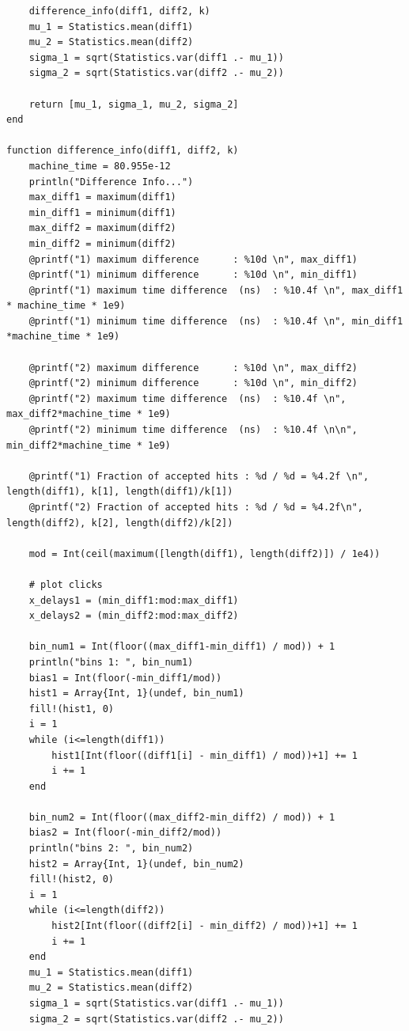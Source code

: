 \documentclass[10pt, final]{article}
\begin{document}
\begin{mdframed}
\begin{lstlisting}
    difference_info(diff1, diff2, k)
    mu_1 = Statistics.mean(diff1)
    mu_2 = Statistics.mean(diff2)
    sigma_1 = sqrt(Statistics.var(diff1 .- mu_1))
    sigma_2 = sqrt(Statistics.var(diff2 .- mu_2)) 

    return [mu_1, sigma_1, mu_2, sigma_2]
end

function difference_info(diff1, diff2, k)
    machine_time = 80.955e-12
    println("Difference Info...")
    max_diff1 = maximum(diff1)
    min_diff1 = minimum(diff1)
    max_diff2 = maximum(diff2)
    min_diff2 = minimum(diff2)
    @printf("1) maximum difference      : %10d \n", max_diff1)
    @printf("1) minimum difference      : %10d \n", min_diff1)
    @printf("1) maximum time difference  (ns)  : %10.4f \n", max_diff1 * machine_time * 1e9)
    @printf("1) minimum time difference  (ns)  : %10.4f \n", min_diff1 *machine_time * 1e9)

    @printf("2) maximum difference      : %10d \n", max_diff2)
    @printf("2) minimum difference      : %10d \n", min_diff2)
    @printf("2) maximum time difference  (ns)  : %10.4f \n", max_diff2*machine_time * 1e9)
    @printf("2) minimum time difference  (ns)  : %10.4f \n\n", min_diff2*machine_time * 1e9)

    @printf("1) Fraction of accepted hits : %d / %d = %4.2f \n", length(diff1), k[1], length(diff1)/k[1])
    @printf("2) Fraction of accepted hits : %d / %d = %4.2f\n", length(diff2), k[2], length(diff2)/k[2])

    mod = Int(ceil(maximum([length(diff1), length(diff2)]) / 1e4))

    # plot clicks 
    x_delays1 = (min_diff1:mod:max_diff1)
    x_delays2 = (min_diff2:mod:max_diff2)

    bin_num1 = Int(floor((max_diff1-min_diff1) / mod)) + 1
    println("bins 1: ", bin_num1)
    bias1 = Int(floor(-min_diff1/mod))
    hist1 = Array{Int, 1}(undef, bin_num1)
    fill!(hist1, 0)
    i = 1
    while (i<=length(diff1))
        hist1[Int(floor((diff1[i] - min_diff1) / mod))+1] += 1
        i += 1
    end

    bin_num2 = Int(floor((max_diff2-min_diff2) / mod)) + 1
    bias2 = Int(floor(-min_diff2/mod))
    println("bins 2: ", bin_num2)
    hist2 = Array{Int, 1}(undef, bin_num2)
    fill!(hist2, 0)
    i = 1
    while (i<=length(diff2))
        hist2[Int(floor((diff2[i] - min_diff2) / mod))+1] += 1
        i += 1
    end
    mu_1 = Statistics.mean(diff1)
    mu_2 = Statistics.mean(diff2)
    sigma_1 = sqrt(Statistics.var(diff1 .- mu_1))
    sigma_2 = sqrt(Statistics.var(diff2 .- mu_2)) 


\end{lstlisting}
\end{mdframed}
\end{document}
